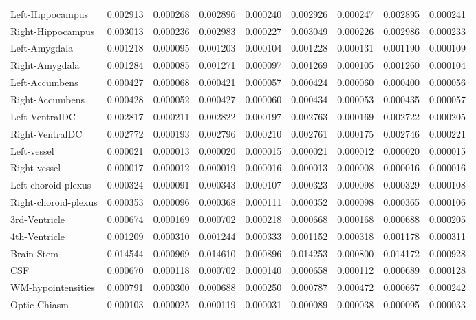 \begin{tabular}{lllllllll}
Left-Hippocampus & 0.002913 & 0.000268 & 0.002896 & 0.000240 & 0.002926 & 0.000247 & 0.002895 & 0.000241 \\
Right-Hippocampus & 0.003013 & 0.000236 & 0.002983 & 0.000227 & 0.003049 & 0.000226 & 0.002986 & 0.000233 \\
Left-Amygdala & 0.001218 & 0.000095 & 0.001203 & 0.000104 & 0.001228 & 0.000131 & 0.001190 & 0.000109 \\
Right-Amygdala & 0.001284 & 0.000085 & 0.001271 & 0.000097 & 0.001269 & 0.000105 & 0.001260 & 0.000104 \\
Left-Accumbens & 0.000427 & 0.000068 & 0.000421 & 0.000057 & 0.000424 & 0.000060 & 0.000400 & 0.000056 \\
Right-Accumbens & 0.000428 & 0.000052 & 0.000427 & 0.000060 & 0.000434 & 0.000053 & 0.000435 & 0.000057 \\
Left-VentralDC & 0.002817 & 0.000211 & 0.002822 & 0.000197 & 0.002763 & 0.000169 & 0.002722 & 0.000205 \\
Right-VentralDC & 0.002772 & 0.000193 & 0.002796 & 0.000210 & 0.002761 & 0.000175 & 0.002746 & 0.000221 \\
Left-vessel & 0.000021 & 0.000013 & 0.000020 & 0.000015 & 0.000021 & 0.000012 & 0.000020 & 0.000015 \\
Right-vessel & 0.000017 & 0.000012 & 0.000019 & 0.000016 & 0.000013 & 0.000008 & 0.000016 & 0.000016 \\
Left-choroid-plexus & 0.000324 & 0.000091 & 0.000343 & 0.000107 & 0.000323 & 0.000098 & 0.000329 & 0.000108 \\
Right-choroid-plexus & 0.000353 & 0.000096 & 0.000368 & 0.000111 & 0.000352 & 0.000098 & 0.000365 & 0.000106 \\
3rd-Ventricle & 0.000674 & 0.000169 & 0.000702 & 0.000218 & 0.000668 & 0.000168 & 0.000688 & 0.000205 \\
4th-Ventricle & 0.001209 & 0.000310 & 0.001244 & 0.000333 & 0.001152 & 0.000318 & 0.001178 & 0.000311 \\
Brain-Stem & 0.014544 & 0.000969 & 0.014610 & 0.000896 & 0.014253 & 0.000800 & 0.014172 & 0.000928 \\
CSF & 0.000670 & 0.000118 & 0.000702 & 0.000140 & 0.000658 & 0.000112 & 0.000689 & 0.000128 \\
WM-hypointensities & 0.000791 & 0.000300 & 0.000688 & 0.000250 & 0.000787 & 0.000472 & 0.000667 & 0.000242 \\
Optic-Chiasm & 0.000103 & 0.000025 & 0.000119 & 0.000031 & 0.000089 & 0.000038 & 0.000095 & 0.000033 \\

\end{tabular}
